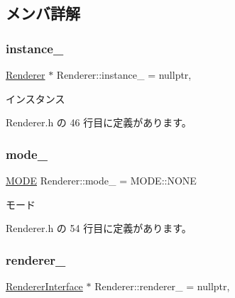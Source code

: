 \subsection{メンバ詳解}
\mbox{\label{class_renderer_aa0ca48ac8408e8726d5dd135432ae4fa}} 
\subsubsection{\texorpdfstring{instance\+\_\+}{instance\_}}
{\footnotesize\ttfamily \mbox{\hyperlink{class_renderer}{Renderer}} $\ast$ Renderer\+::instance\+\_\+ = nullptr\hspace{0.3cm}{\ttfamily [static]}, {\ttfamily [private]}}



インスタンス 



 Renderer.\+h の 46 行目に定義があります。

\mbox{\label{class_renderer_adaed44b3c6c8b0879b8cd52f677941cf}} 
\subsubsection{\texorpdfstring{mode\+\_\+}{mode\_}}
{\footnotesize\ttfamily \mbox{\hyperlink{class_renderer_ab5a9379ccadcf2b3394c61cf8c835fec}{M\+O\+DE}} Renderer\+::mode\+\_\+ = M\+O\+D\+E\+::\+N\+O\+NE\hspace{0.3cm}{\ttfamily [private]}}



モード 



 Renderer.\+h の 54 行目に定義があります。

\mbox{\label{class_renderer_a64d00cd885d84ff355228d884c0215dc}} 
\subsubsection{\texorpdfstring{renderer\+\_\+}{renderer\_}}
{\footnotesize\ttfamily \mbox{\hyperlink{class_renderer_interface}{Renderer\+Interface}} $\ast$ Renderer\+::renderer\+\_\+ = nullptr\hspace{0.3cm}{\ttfamily [static]}, {\ttfamily [private]}}




